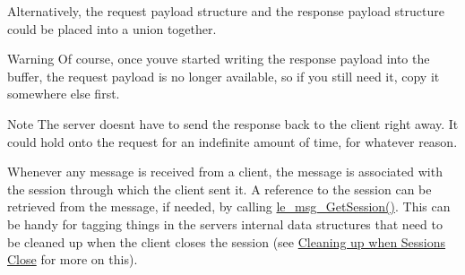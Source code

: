 Alternatively, the request payload structure and the response payload structure could be placed into a union together.




\begin{DoxyWarning}{Warning}
Of course, once you\textquotesingle{}ve started writing the response payload into the buffer, the request payload is no longer available, so if you still need it, copy it somewhere else first.
\end{DoxyWarning}
\begin{DoxyNote}{Note}
The server doesn\textquotesingle{}t have to send the response back to the client right away. It could hold onto the request for an indefinite amount of time, for whatever reason.
\end{DoxyNote}
Whenever any message is received from a client, the message is associated with the session through which the client sent it. A reference to the session can be retrieved from the message, if needed, by calling \hyperlink{le__messaging_8h_a253088f1b852575b60d7732ca7afc79b}{le\+\_\+msg\+\_\+\+Get\+Session()}. This can be handy for tagging things in the server\textquotesingle{}s internal data structures that need to be cleaned up when the client closes the session (see \hyperlink{c_messaging_c_messagingServerCleanUp}{Cleaning up when Sessions Close} for more on this).

